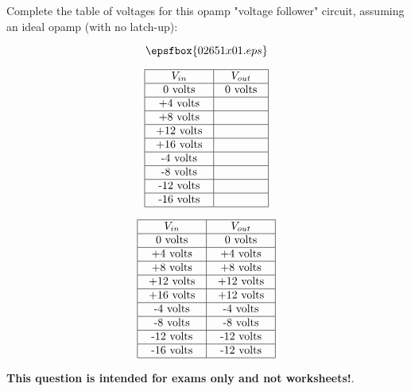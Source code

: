 

Complete the table of voltages for this opamp "voltage follower" circuit, assuming an ideal opamp (with no latch-up):

$$\epsfbox{02651x01.eps}$$


$$\vbox{\offinterlineskip
\halign{\strut
\vrule \quad\hfil # \ \hfil & 
\vrule \quad\hfil # \ \hfil \vrule \cr
\noalign{\hrule}
%
$V_{in}$ & $V_{out}$ \cr
%
\noalign{\hrule}
%
0 volts & 0 volts \cr
%
\noalign{\hrule}
%
+4 volts &  \cr
%
\noalign{\hrule}
%
+8 volts &  \cr
%
\noalign{\hrule}
%
+12 volts &  \cr
%
\noalign{\hrule}
%
+16 volts &  \cr
%
\noalign{\hrule}
%
-4 volts &  \cr
%
\noalign{\hrule}
%
-8 volts &  \cr
%
\noalign{\hrule}
%
-12 volts &  \cr
%
\noalign{\hrule}
%
-16 volts &  \cr
%
\noalign{\hrule}
} %
}$$ %








$$\vbox{\offinterlineskip
\halign{\strut
\vrule \quad\hfil # \ \hfil & 
\vrule \quad\hfil # \ \hfil \vrule \cr
\noalign{\hrule}
%
$V_{in}$ & $V_{out}$ \cr
%
\noalign{\hrule}
%
0 volts & 0 volts \cr
%
\noalign{\hrule}
%
+4 volts & +4 volts \cr
%
\noalign{\hrule}
%
+8 volts & +8 volts \cr
%
\noalign{\hrule}
%
+12 volts & +12 volts \cr
%
\noalign{\hrule}
%
+16 volts & +12 volts \cr
%
\noalign{\hrule}
%
-4 volts & -4 volts \cr
%
\noalign{\hrule}
%
-8 volts & -8 volts \cr
%
\noalign{\hrule}
%
-12 volts & -12 volts \cr
%
\noalign{\hrule}
%
-16 volts & -12 volts \cr
%
\noalign{\hrule}
} %
}$$ %







{\bf This question is intended for exams only and not worksheets!}.




